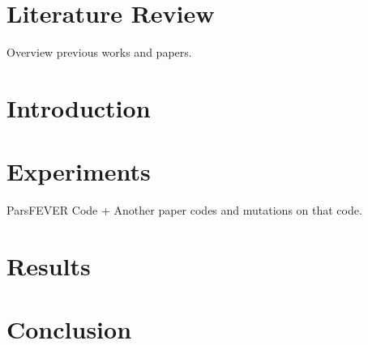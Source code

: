 

\section{Literature Review}
Overview previous works and papers.
\section{Introduction}

\section{Experiments}
ParsFEVER Code + Another paper codes and mutations on that code. 
\section{Results}
\section{Conclusion}




